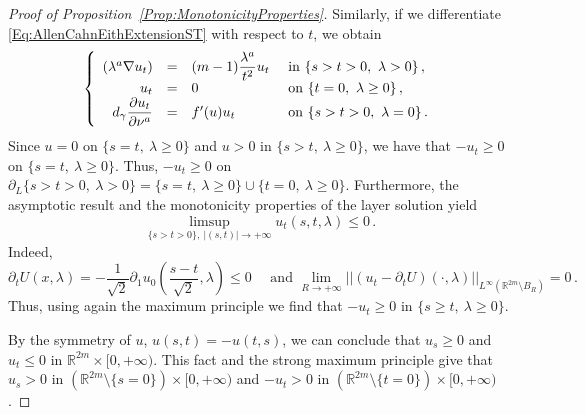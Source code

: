 \documentclass[12pt,reqno]{amsart}
\theoremstyle{definition}
\theoremstyle{remark}
\newcommand{\con}[1]{\mathbb{#1}}
\newcommand{\R}{\con{R}} %
\newcommand{\norm}[1]{\left | \left |{#1} \right | \right |}
\newcommand{\s}{\gamma}
\newcommand{\bpar}[1]{\left ( {#1}\right )}
\newcommand\beqc[1]{\left\{\begin{array}{#1}}
\newcommand\eeqc{\end{array} \right.}
\def\PDEsystem{rcll}
\let\div\relax
\DeclareMathOperator{\div}{div}
\numberwithin{equation}{section}
\begin{document}
\begin{proof}[Proof of Proposition~\ref{Prop:MonotonicityProperties}]
Similarly, if we differentiate \eqref{Eq:AllenCahnEithExtensionST} with respect to $t$, we obtain
$$
\beqc{\PDEsystem}
\div (\lambda^a \nabla u_t) &=& (m-1) \dfrac{\lambda^a}{t^2}u_t & \text{ in } \{ s > t > 0 ,\ \lambda > 0\}\,, \\
u_t& = & 0& \text{ on } \{t=0, \ \lambda \geq 0 \}\,, \\
d_\s \dfrac{\partial u_t}{\partial \nu^a}& = & f'(u)u_t& \text{ on }  \{ s > t > 0 , \ \lambda = 0\}\,.
\eeqc
$$
Since $u = 0$ on $\{s = t,\ \lambda \geq 0 \}$ and $u>0$ in $\{s > t,\ \lambda \geq 0 \}$, we have that $-u_t \geq 0$ on $\{s = t,\ \lambda \geq 0 \}$. Thus, $-u_t \geq 0$ on $\partial_L \{ s > t > 0 ,\ \lambda > 0\} = \{s = t,\ \lambda \geq 0 \}\cup \{t=0, \ \lambda \geq 0\}$. Furthermore, the asymptotic result and the monotonicity properties of the layer solution yield
$$
\limsup_{\{s> t>0\} ,\ |(s,t)|\to +\infty}  u_t(s,t,\lambda) \leq 0\,.
$$
Indeed, 
$$
\partial_t U (x,\lambda) = -\dfrac{1}{\sqrt{2}} \partial_1 u_0\bpar{\dfrac{s-t}{\sqrt{2}}, \lambda} \leq 0 \quad \text{ and } \lim_{R\to +\infty} \norm{(u_t - \partial_t U) (\cdot,\lambda) }_{L^\infty(\R^{2m}\setminus B_{R})} = 0\,.
$$
Thus, using again the maximum principle we find that $-u_t \geq 0$ in $\{ s \geq t,\ \lambda \geq 0\}$.

By the symmetry of $u$, $u(s,t)=-u(t,s)$, we can conclude that  $u_s \geq 0$ and $u_t \leq 0$ in $\R^{2m} \times [0, +\infty)$. This fact and the strong maximum principle give that $u_s > 0$ in $(\R^{2m}\setminus \{s=0\}) \times [0, +\infty)$ and $- u_t > 0$ in $(\R^{2m}\setminus \{t=0\}) \times [0, +\infty)$.


\end{proof}
\end{document}
